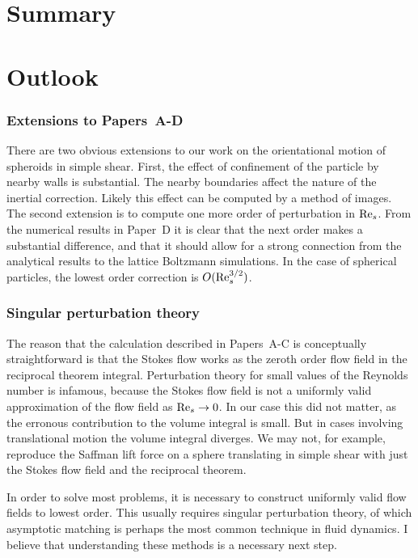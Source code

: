 \documentclass[thesis.tex]{subfiles}
\begin{document}
\section{Summary}

\section{Outlook}

\subsubsection{Extensions to Papers~A-D}

There are two obvious extensions to our work on the orientational motion of spheroids in simple shear. First, the effect of confinement of the particle by nearby walls is substantial. The nearby boundaries affect the nature of the inertial correction. Likely this effect can be computed by a method of images. The second extension is to compute one more order of perturbation in $\textrm{Re}_s$. From the numerical results in Paper~D it is clear that the next order makes a substantial difference, and that it should allow for a strong connection from the analytical results to the lattice Boltzmann simulations. In the case of spherical particles, the lowest order correction is $O(\textrm{Re}_s^{3/2})$.

\subsubsection{Singular perturbation theory}

The reason that the calculation described in Papers~A-C is conceptually straightforward is that the Stokes flow works as the zeroth order flow field in the reciprocal theorem integral. Perturbation theory for small values of the Reynolds number is infamous, because the Stokes flow field is not a uniformly valid approximation of the flow field as $\textrm{Re}_s\to0$. In our case this did not matter, as the erronous contribution to the volume integral is small. But in cases involving translational motion the volume integral diverges. We may not, for example, reproduce the Saffman lift force on a sphere translating in simple shear with just the Stokes flow field and the reciprocal theorem.

In order to solve most problems, it is necessary to construct uniformly valid flow fields to lowest order. This usually requires singular perturbation theory, of which asymptotic matching is perhaps the most common technique in fluid dynamics. I believe that understanding these methods is a necessary next step.
\end{document}
